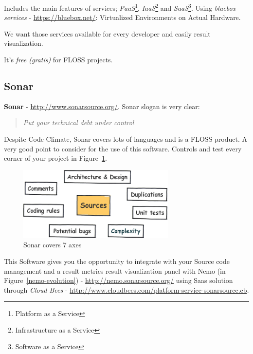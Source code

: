 \documentclass[11pt]{scrartcl}
\begin{document}
\par Includes the main features of services; \emph{PaaS}\footnote{Platform as a Service}, \emph{IaaS}\footnote{Infrastructure as a Service} and \emph{SaaS}\footnote{Software as a Service}. Using \emph{bluebox services} - \url{https://bluebox.net/}: Virtualized Environments on Actual Hardware.

\par We want those services available for every developer and easily result visualization.

\par It's \emph{free (gratis)} for FLOSS projects.


\subsection{Sonar}
\label{sub:sonar}

\textbf{Sonar} - \url{http://www.sonarsource.org/}. Sonar slogan is very clear:

\begin{quote}
    \emph{Put your technical debt under control}
\end{quote}

\par Despite Code Climate, Sonar covers lots of languages and is a FLOSS product. A very good point to consider for the use of this software. Controls and test every corner of your project in Figure~\ref{sonar7axes}.

\begin{figure}[H]
\centering
\includegraphics[width=0.7\textwidth]{sonar7axes.png}
\caption{Sonar covers 7 axes}
\label{sonar7axes}
\end{figure}

\par This Software gives you the opportunity to integrate with your Source code management and a result metrics result visualization panel with Nemo (in Figure~\ref{nemo-evolution}) - \url{http://nemo.sonarsource.org/} using Saas solution through \emph{Cloud Bees} - \url{http://www.cloudbees.com/platform-service-sonarsource.cb}.
\end{document}
